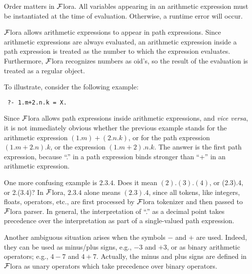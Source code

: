 \documentclass[11pt]{article}
\newcommand{\FLORA}{{\mbox{${\cal F}${\sc lora}}}\xspace}
\begin{document}
Order matters in \FLORA. All variables appearing in an arithmetic
expression must be instantiated at the time of evaluation. Otherwise, a
runtime error will occur.

\FLORA allows arithmetic expressions to appear in path expressions. Since
arithmetic expressions are always evaluated, an arithmetic expression
inside a path expression is treated as the number to which the
expression evaluates. Furthermore, \FLORA recognizes numbers as oid's, so
the result of the evaluation is treated as a regular object.

To illustrate, consider the following example:
\begin{verbatim}
 ?- 1.m+2.n.k = X.
\end{verbatim}
Since \FLORA allows path expressions inside arithmetic expressions, and
{\it vice versa}, it is not immediately obvious whether the previous
example stands for the arithmetic expression $(1.m)+(2.n.k)$, or for the
path expression $(1.m+2.n).k$, or the expression $(1.m + 2).n.k$.  The
answer is the first path expression, because ``.'' in a path expression
binds stronger than ``+'' in an arithmetic expression.

One more confusing example is $2.3.4$. Does it mean $(2).(3).(4)$, or
(2.3).4, or 2.(3.4)?  In \FLORA, $2.3.4$ alone means $(2.3).4$, since all
tokens, like integers, floats, operators, etc., are first
processed by \FLORA tokenizer and then passed to \FLORA parser.
In general, the interpretation of ``.'' as a decimal point takes precedence
over the interpretation as part of a single-valued path expression.

Another ambiguous situation arises when the symbols $-$ and $+$ are used.
Indeed, they can be used as minus/plus signs, e.g., $-3$ and $+3$, or as binary
arithmetic operators; e.g., $4-7$ and $4+7$. Actually, the minus and plus
signs are defined in \FLORA as unary operators which take precedence over
binary operators.
\end{document}
